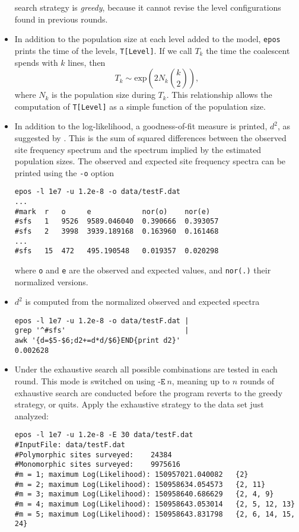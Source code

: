 \documentclass[a4paper, english]{article}
\newcommand{\ty}{\texttt}
\begin{document}
\begin{itemize}
search strategy is \emph{greedy}, because it cannot revise the level
configurations found in previous rounds.
\item In addition to the population size at each level added to the model, \ty{epos}
  prints the time of the levels, \ty{T[Level]}. If we call $T_k$ the
  time the coalescent spends with $k$ lines, then
  \[
  T_k\sim \mbox{exp}\left(2N_k{k\choose 2}\right),
  \]
  where $N_k$ is the population size during $T_k$. This relationship
  allows the computation of \ty{T[Level]} as a simple function of the
  population size.
\item In addition to the log-likelihood, a goodness-of-fit measure is
  printed, $d^2$, as suggested by \cite{lap17:acc}. This is the sum of
  squared differences between the observed site frequency spectrum and
  the spectrum implied by the estimated population sizes. The observed
  and expected site frequency spectra can be printed using the \ty{-o}
  option
\begin{verbatim}
epos -l 1e7 -u 1.2e-8 -o data/testF.dat 
...
#mark  r   o     e            nor(o)    nor(e)
#sfs   1   9526  9589.046040  0.390666  0.393057
#sfs   2   3998  3939.189168  0.163960  0.161468
...
#sfs   15  472   495.190548   0.019357  0.020298
\end{verbatim}
where \ty{o} and \ty{e} are the observed and expected values, and
\ty{nor(.)} their normalized versions.
\item $d^2$ is computed from the normalized observed and expected
  spectra
\begin{verbatim}
epos -l 1e7 -u 1.2e-8 -o data/testF.dat | 
grep '^#sfs'                            | 
awk '{d=$5-$6;d2+=d*d/$6}END{print d2}'
0.002628
\end{verbatim}
\item Under the exhaustive search all possible combinations are tested in each
round. This mode is switched on using $\ty{-E}\ n$, meaning up to $n$
rounds of exhaustive search are conducted before the program reverts
to the greedy strategy, or quits. Apply the exhaustive strategy to the
data set just analyzed:
\begin{verbatim}
epos -l 1e7 -u 1.2e-8 -E 30 data/testF.dat 
#InputFile:	data/testF.dat
#Polymorphic sites surveyed:	24384
#Monomorphic sites surveyed:	9975616
#m = 1; maximum Log(Likelihood): 150957021.040082	{2}
#m = 2; maximum Log(Likelihood): 150958634.054573	{2, 11}
#m = 3; maximum Log(Likelihood): 150958640.686629	{2, 4, 9}
#m = 4; maximum Log(Likelihood): 150958643.053014	{2, 5, 12, 13}
#m = 5; maximum Log(Likelihood): 150958643.831798	{2, 6, 14, 15, 24}

\end{verbatim}
\end{itemize}
\end{document}
